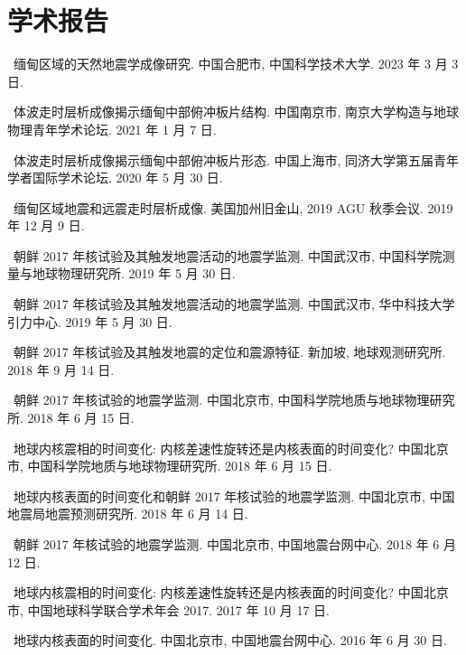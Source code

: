 \section{学术报告}

\newcommand{\Invited}{\textbf{[邀请报告]}}

\begin{etaremune}
\item
    \Yao\
    缅甸区域的天然地震学成像研究.
    中国合肥市, 中国科学技术大学.
    2023 年 3 月 3日.
\item
    \Yao\
    体波走时层析成像揭示缅甸中部俯冲板片结构.
    中国南京市, 南京大学构造与地球物理青年学术论坛.
    2021 年 1 月 7 日.
\item
    \Yao\
    体波走时层析成像揭示缅甸中部俯冲板片形态.
    中国上海市, 同济大学第五届青年学者国际学术论坛.
    2020 年 5 月 30 日.
\item
    \Yao\
    缅甸区域地震和远震走时层析成像.
    美国加州旧金山, 2019 AGU 秋季会议.
    2019 年 12 月 9 日.
\item
    \Yao\
    朝鲜 2017 年核试验及其触发地震活动的地震学监测.
    中国武汉市, 中国科学院测量与地球物理研究所.
    2019 年 5 月 30 日.
\item
    \Yao\
    朝鲜 2017 年核试验及其触发地震活动的地震学监测.
    中国武汉市, 华中科技大学引力中心.
    2019 年 5 月 30 日.
\item
    \Yao\
    朝鲜 2017 年核试验及其触发地震的定位和震源特征.
    新加坡, 地球观测研究所.
    2018 年 9 月 14 日.
\item
    \Yao\
    朝鲜 2017 年核试验的地震学监测.
    中国北京市, 中国科学院地质与地球物理研究所.
    2018 年 6 月 15 日.
\item
    \Yao\
    地球内核震相的时间变化: 内核差速性旋转还是内核表面的时间变化?
    中国北京市, 中国科学院地质与地球物理研究所.
    2018 年 6 月 15 日.
\item
    \Yao\
    地球内核表面的时间变化和朝鲜 2017 年核试验的地震学监测.
    中国北京市, 中国地震局地震预测研究所.
    2018 年 6 月 14 日.
\item
    \Yao\
    朝鲜 2017 年核试验的地震学监测.
    中国北京市, 中国地震台网中心.
    2018 年 6 月 12 日.
\item
    \Yao\
    地球内核震相的时间变化: 内核差速性旋转还是内核表面的时间变化?
    中国北京市, 中国地球科学联合学术年会 2017.
    2017 年 10 月 17 日.
\item
    \Yao\
    地球内核表面的时间变化.
    中国北京市, 中国地震台网中心.
    2016 年 6 月 30 日.
\end{etaremune}

